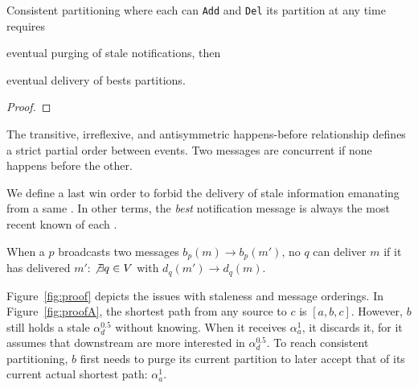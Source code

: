 


\begin{corollary}
  Consistent partitioning where each \process can \texttt{Add} and
  \texttt{Del} its partition at any time requires
  \begin{inparaenum}[(i)]
  \item eventual purging of stale notifications, then
  \item eventual delivery of bests partitions.
  \end{inparaenum}
\end{corollary}

\begin{proof}
\end{proof}



\begin{definition}
  The transitive, irreflexive, and antisymmetric happens-before
  relationship defines a strict partial order between events. Two
  messages are concurrent if none happens before the other.
\end{definition}

We define a last win order to forbid the delivery of stale information
emanating from a same \process. In other terms, the \emph{best}
notification message is always the most recent known of each \process.
 
\begin{definition}
  When a \process $p$ broadcasts two messages $b_p(m) \rightarrow
  b_p(m')$, no \process $q$ can deliver $m$ if it has delivered $m'$:
  $\not\exists q \in V$ with $d_q(m') \rightarrow d_q(m)$.
\end{definition}



Figure~\ref{fig:proof} depicts the issues with staleness and message
orderings. In Figure~\ref{fig:proofA}, the shortest path from any
source to \Process $c$ is $[a, b, c]$. However, \Process $b$ still holds
a stale $\alpha_d^{0.5}$ without knowing. When it receives
$\alpha_a^1$, it discards it, for it assumes that downstream \processes
are more interested in $\alpha_d^{0.5}$. To reach consistent
partitioning, \Process $b$ first needs to purge its current partition
to later accept that of its current actual shortest path:
$\alpha_a^1$.

